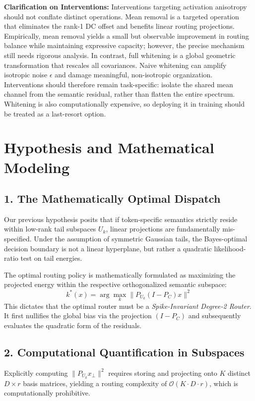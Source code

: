 \documentclass[11pt]{article}
\begin{document}
\textbf{Clarification on Interventions:} Interventions targeting activation anisotropy should not conflate distinct operations. Mean removal is a targeted operation that eliminates the rank-1 DC offset and benefits linear routing projections. Empirically, mean removal yields a small but observable improvement in routing balance while maintaining expressive capacity; however, the precise mechanism still needs rigorous analysis. In contrast, full whitening is a global geometric transformation that rescales all covariances. Naive whitening can amplify isotropic noise $\epsilon$ and damage meaningful, non-isotropic organization. Interventions should therefore remain task-specific: isolate the shared mean channel from the semantic residual, rather than flatten the entire spectrum. Whitening is also computationally expensive, so deploying it in training should be treated as a last-resort option.

\section{Hypothesis and Mathematical Modeling}

\subsection*{1. The Mathematically Optimal Dispatch}
Our previous hypothesis posits that if token-specific semantics strictly reside within low-rank tail subspaces $U_k$, linear projections are fundamentally mis-specified. Under the assumption of symmetric Gaussian tails, the Bayes-optimal decision boundary is not a linear hyperplane, but rather a quadratic likelihood-ratio test on tail energies. 

The optimal routing policy is mathematically formulated as maximizing the projected energy within the respective orthogonalized semantic subspace:
\begin{equation}
    k^*(x) = \arg\max_k \|P_{U_k} (I - P_C)x\|^2
\end{equation}
This dictates that the optimal router must be a \textit{Spike-Invariant Degree-2 Router}. It first nullifies the global bias via the projection $(I-P_C)$ and subsequently evaluates the quadratic form of the residuals.

\subsection*{2. Computational Quantification in Subspaces}
Explicitly computing $\|P_{U_k} x_\perp\|^2$ requires storing and projecting onto $K$ distinct $D \times r$ basis matrices, yielding a routing complexity of $\mathcal{O}(K \cdot D \cdot r)$, which is computationally prohibitive. 
\end{document}

